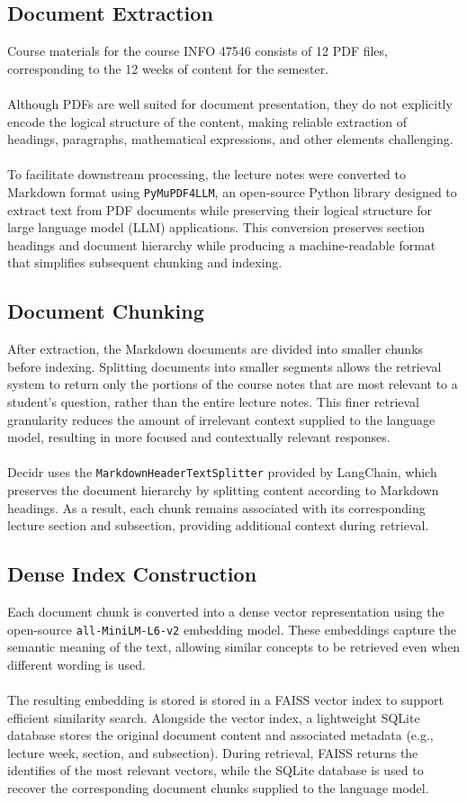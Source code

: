 \documentclass[12pt, a4paper]{report}
\begin{document}
\subsection{Document Extraction}
Course materials for the course INFO 47546 consists of 12 PDF files, corresponding to the 12 weeks of content for the semester.~\\~\\
Although PDFs are well suited for document presentation, they do not explicitly encode the logical structure of the content, making reliable extraction of headings, paragraphs, mathematical expressions, and other elements challenging.~\\~\\
To facilitate downstream processing, the lecture notes were converted to Markdown format using \texttt{PyMuPDF4LLM}, an open-source Python library designed to extract text from PDF documents while preserving their logical structure for large language model (LLM) applications. This conversion preserves section headings and document hierarchy while producing a machine-readable format that simplifies subsequent chunking and indexing.
\subsection{Document Chunking}
After extraction, the Markdown documents are divided into smaller chunks before indexing. Splitting documents into smaller segments allows the retrieval system to return only the portions of the course notes that are most relevant to a student's question, rather than the entire lecture notes. This finer retrieval granularity reduces the amount of irrelevant context supplied to the language model, resulting in more focused and contextually relevant responses.~\\~\\
Decidr uses the \texttt{MarkdownHeaderTextSplitter} provided by LangChain, which preserves the document hierarchy by splitting content according to Markdown headings. As a result, each chunk remains associated with its corresponding lecture section and subsection, providing additional context during retrieval.
\subsection{Dense Index Construction}
Each document chunk is converted into a dense vector representation using the open-source \texttt{all-MiniLM-L6-v2} embedding model. These embeddings capture the semantic meaning of the text, allowing similar concepts to be retrieved even when different wording is used.~\\~\\
The resulting embedding is stored is stored in a FAISS vector index \cite{douze24} to support efficient similarity search. Alongside the vector index, a lightweight SQLite database stores the original document content and associated metadata (e.g., lecture week, section, and subsection). During retrieval, FAISS returns the identifies of the most relevant vectors, while the SQLite database is used to recover the corresponding document chunks supplied to the language model.
\end{document}
